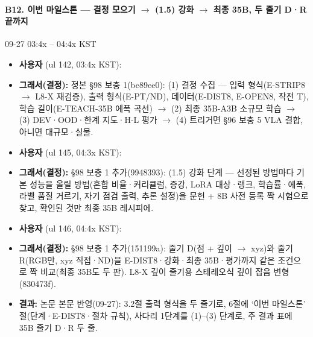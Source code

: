 \paragraph{B12. 이번 마일스톤 --- 결정 모으기 $\rightarrow$ (1.5) 강화 $\rightarrow$ 최종 35B, 두 줄기 D·R 끝까지}
{\small 09-27 03:4x -- 04:4x KST}
\begin{itemize}
  \item \textbf{사용자} (ul 142, 03:4x KST): 
  \item \textbf{그래서(결정):} 정본 §98 보충 1(be89ee0): (1) 결정 수집 --- 입력 형식(E-STRIP8 $\rightarrow$ L8-X 재검증), 출력 형식(E-PT/ND), 데이터(E-DIST8, E-OPEN8, 작전 T), 학습 길이(E-TEACH-35B 에폭 곡선) $\rightarrow$ (2) 최종 35B-A3B 소규모 학습 $\rightarrow$ (3) DEV·OOD·한계 지도·H-L 평가 $\rightarrow$ (4) 트리거면 §96 보충 5 VLA 결합, 아니면 대규모·실물.
  \item \textbf{사용자} (ul 145, 04:3x KST): 
  \item \textbf{그래서(결정):} §98 보충 1 추가(9948393): (1.5) 강화 단계 --- 선정된 방법마다 기본 성능을 올릴 방법(혼합 비율·커리큘럼, 증강, LoRA 대상·랭크, 학습률·에폭, 라벨 품질 거르기, 자기 점검 출력, 추론 설정)을 문헌 + 8B 사전 등록 짝 시험으로 찾고, 확인된 것만 최종 35B 레시피에.
  \item \textbf{사용자} (ul 146, 04:4x KST): 
  \item \textbf{그래서(결정):} §98 보충 1 추가(151199a): 줄기 D(점 + 깊이 $\rightarrow$ xyz)와 줄기 R(RGB만, xyz 직접·ND)을 E-DIST8·강화·최종 35B·평가까지 같은 조건으로 짝 비교(최종 35B도 두 판). L8-X 깊이 줄기용 스테레오식 깊이 잡음 변형(830473f).
  \item \textbf{결과:} 논문 본문 반영(09-27): 3.2절 출력 형식을 두 줄기로, 6절에 `이번 마일스톤' 절(단계·E-DIST8·절차 규칙), 사다리 1단계를 (1)--(3) 단계로, 주 결과 표에 35B 줄기 D·R 두 줄.
\end{itemize}

